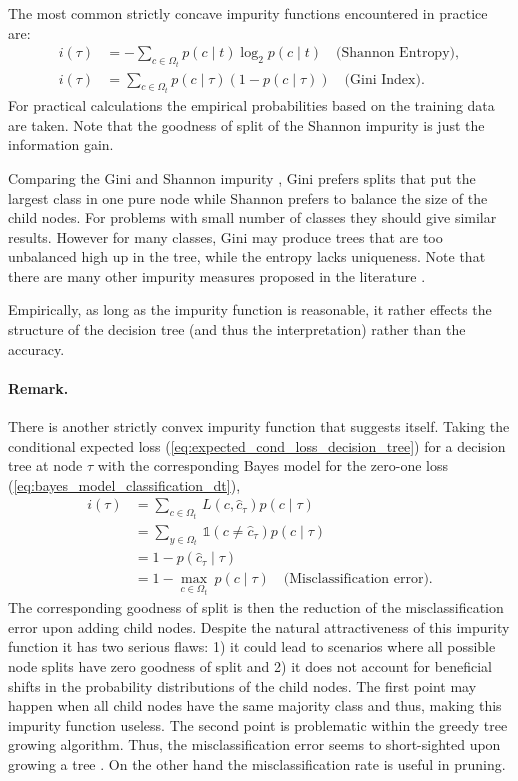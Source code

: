 \documentclass[12pt,a4paper]{article}
\begin{document}
The most common strictly concave impurity functions encountered in practice are:
	\begin{align}
    i(\tau) &= - \sum_{c \in \Omega_t} p(c \mid t) \log_2 p(c \mid t) \quad \text{(Shannon Entropy)} \label{eq:shannon_impurity}, \\ 
    i(\tau) &= \sum_{c \in \Omega_t} p(c \mid \tau) (1 - p(c \mid \tau)) \quad \text{(Gini Index)} \label{eq:gini_impurity}.
    \end{align}
For practical calculations the empirical probabilities based on the training data are taken. Note that the goodness of split of the Shannon impurity is just the information gain. 

Comparing the Gini and Shannon impurity \cite{Breiman1996}, Gini prefers splits that put the largest class in one pure node while Shannon prefers to balance the size of the child nodes. For problems with small number of classes they should give similar results. However for many classes, Gini may produce trees that are too unbalanced high up in the tree, while the entropy lacks uniqueness. Note that there are many other impurity measures proposed in the literature \cite{gini_vs_twoing, epub1833,  BERZAL200331}. 

Empirically, as long as the impurity function is reasonable, it rather effects the structure of the decision tree (and thus the interpretation) rather than the accuracy.

\paragraph{Remark.}There is another strictly convex impurity function that suggests itself. Taking the conditional expected loss (\ref{eq:expected_cond_loss_decision_tree}) for a decision tree at node $\tau$ with the corresponding Bayes model for the zero-one loss (\ref{eq:bayes_model_classification_dt}), 
\begin{align} \label{eq:impurity_misclassification_rate}
	i(\tau) &= \sum_{c\in \Omega_t} \,L(c, \hat c_\tau) p(c \mid \tau)  \nonumber \\ 
	 &=\sum_{y\in \Omega_t} \, \mathbb 1 (c \neq \hat c_\tau) p(c \mid \tau)  \nonumber \\
	 &= 1 - p(\hat c_\tau \mid \tau)  \nonumber \\ 
	&= 1 - \underset{c\in \Omega_t}{\operatorname{max}} ~ p(c \mid\tau) \quad \text{(Misclassification error)}.
\end{align}    
The corresponding goodness of split is then the reduction of the misclassification  error upon adding child nodes. 
Despite the natural attractiveness of this impurity function it has two serious flaws: 1) it could lead to scenarios where all possible node splits have zero goodness of split and 2) it does not account for beneficial shifts in the probability distributions of the child nodes. 
The first point may happen when all child nodes have the same majority class \cite{cart84, understanding_random_forests} and thus, making this impurity function useless. The second point is problematic within the greedy tree growing algorithm. Thus, the misclassification error seems to short-sighted upon growing a tree \cite{cart84, hasties}.  On the other hand the misclassification rate is useful in pruning.
\end{document}
